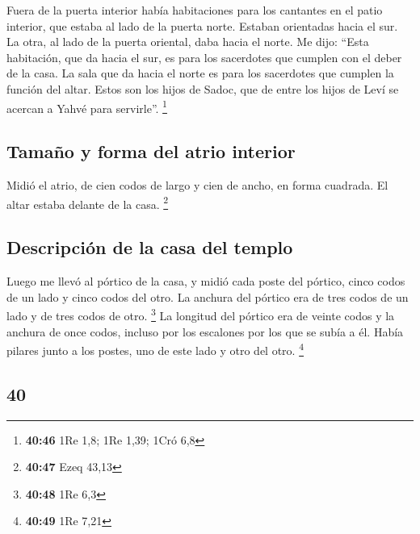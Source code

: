 \begin{paracol}{2}
 Fuera de la puerta interior había habitaciones para los
cantantes en el patio interior, que estaba al lado de la puerta norte.
Estaban orientadas hacia el sur. La otra, al lado de la puerta oriental,
daba hacia el norte.  Me dijo: ``Esta habitación, que da
hacia el sur, es para los sacerdotes que cumplen con el deber de la
casa.  La sala que da hacia el norte es para los
sacerdotes que cumplen la función del altar. Estos son los hijos de
Sadoc, que de entre los hijos de Leví se acercan a Yahvé para
servirle''. \footnote{\textbf{40:46} 1Re 1,8; 1Re 1,39; 1Cró 6,8}

\hypertarget{tamauxf1o-y-forma-del-atrio-interior}{%
\subsection{Tamaño y forma del atrio
interior}\label{tamauxf1o-y-forma-del-atrio-interior}}

 Midió el atrio, de cien codos de largo y cien de ancho,
en forma cuadrada. El altar estaba delante de la casa. \footnote{\textbf{40:47}
  Ezeq 43,13}

\hypertarget{descripciuxf3n-de-la-casa-del-templo}{%
\subsection{Descripción de la casa del
templo}\label{descripciuxf3n-de-la-casa-del-templo}}

 Luego me llevó al pórtico de la casa, y midió cada poste
del pórtico, cinco codos de un lado y cinco codos del otro. La anchura
del pórtico era de tres codos de un lado y de tres codos de otro.
\footnote{\textbf{40:48} 1Re 6,3}  La longitud del
pórtico era de veinte codos y la anchura de once codos, incluso por los
escalones por los que se subía a él. Había pilares junto a los postes,
uno de este lado y otro del otro. \footnote{\textbf{40:49} 1Re 7,21}

\switchcolumn
\begin{otherlanguage}{english}

\hypertarget{section-79}{%
\section{40}\label{section-79}}


\end{otherlanguage}
\end{paracol}
